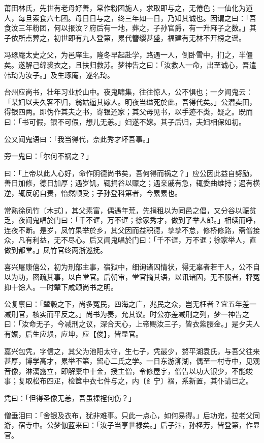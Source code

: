 \documentclass[letterpaper,10pt,english]{sphinxmanual}
\begin{document}
莆田林氏，先世有老母好善，常作粉团施人，求取即与之，无倦色；一仙化为道人，每旦索食六七团。母日日与之，终三年如一日，乃知其诚也。因谓之曰：「吾食汝三年粉团，何以报汝？府后有一地，葬之，子孙官爵，有一升麻子之数。」其子依所点葬之，初世即有九人登第，累代簪缨甚盛，福建有无林不开榜之谣。

冯琢庵太史之父，为邑庠生。隆冬早起赴学，路遇一人，倒卧雪中，扪之，半僵矣。遂解己绵裘衣之，且扶归救苏。梦神告之曰：「汝救人一命，出至诚心，吾遣韩琦为汝子。」及生琢庵，遂名琦。

台州应尚书，壮年习业於山中。夜鬼啸集，往往惊人，公不惧也；一夕闻鬼云：「某妇以夫久客不归，翁姑逼其嫁人。明夜当缢死於此，吾得代矣。」公潜卖田，得银四两。即伪作其夫之书，寄银还家；其父母见书，以手迹不类，疑之。既而曰：「书可假，银不可假，想儿无恙。」妇遂不嫁。其子后归，夫妇相保如初。

公又闻鬼语曰：「我当得代，奈此秀才坏吾事。」

旁一鬼曰：「尔何不祸之？」

曰：「上帝以此人心好，命作阴德尚书矣，吾何得而祸之？」应公因此益自努励，善日加修，德日加厚；遇岁饥，辄捐谷以赈之；遇亲戚有急，辄委曲维持；遇有横逆，辄反躬自责，怡然顺受；子孙登科第者，今累累也。

常熟徐凤竹〔木式〕，其父素富，偶遇年荒，先捐租以为同邑之倡，又分谷以赈贫乏，夜闻鬼唱於门曰：「千不诓，万不诓；徐家秀才，做到了举人郎。」相续而呼，连夜不断。是岁，凤竹果举於乡，其父因而益积德，孳孳不怠，修桥修路，斋僧接众，凡有利益，无不尽心。后又闻鬼唱於门曰：「千不诓，万不诓；徐家举人，直做到都堂。」凤竹官终两浙巡抚。

喜兴屠康僖公，初为刑部主事，宿狱中，细询诸囚情状，得无辜者若干人，公不自以为功，密疏其事，以白堂官。后朝审，堂官摘其语，以讯诸囚，无不服者，释冤抑十馀人。一时辇下咸颂尚书之明。

公复禀曰：「辇毂之下，尚多冤民，四海之广，兆民之众，岂无枉者？宜五年差一减刑官，核实而平反之。」尚书为奏，允其议。时公亦差减刑之列，梦一神告之曰：「汝命无子，今减刑之议，深合天心，上帝赐汝三子，皆衣紫腰金。」是夕夫人有娠，后生应埙，应坤，应【俊】，皆显官。

嘉兴包凭，字信之，其父为池阳太守，生七子，凭最少，赘平湖袁氏，与吾父往来甚厚，博学高才，累举不第，留心二氏之学。一日东游泖湖，偶至一村寺中，见观音像，淋漓露立，即解橐中十金，授主僧，令修屋宇，僧告以功大银少，不能竣事；复取松布四疋，检箧中衣七件与之，内〔纟宁〕褶，系新置，其仆请已之。

凭曰：「但得圣像无恙，吾虽裸裎何伤？」

僧垂泪曰：「舍银及衣布，犹非难事。只此一点心，如何易得。」后功完，拉老父同游，宿寺中。公梦伽蓝来曰：「汝子当享世禄矣。」后子汴，孙柽芳，皆登第，作显官。
\end{document}
